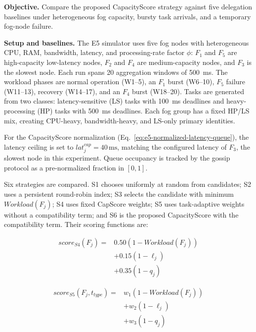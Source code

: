 \documentclass[conference]{IEEEtran}
\begin{document}
    \textbf{Objective.} Compare the proposed CapacityScore strategy against five delegation baselines under heterogeneous fog capacity, bursty task arrivals, and a temporary fog-node failure.

    \textbf{Setup and baselines.} The E5 simulator uses five fog nodes with heterogeneous CPU, RAM, bandwidth, latency, and processing-rate factor $\phi$: $F_1$ and $F_5$ are high-capacity low-latency nodes, $F_2$ and $F_4$ are medium-capacity nodes, and $F_3$ is the slowest node. Each run spans 20 aggregation windows of 500~ms. The workload phases are normal operation (W1--5), an $F_1$ burst (W6--10), $F_5$ failure (W11--13), recovery (W14--17), and an $F_4$ burst (W18--20). Tasks are generated from two classes: latency-sensitive (LS) tasks with 100~ms deadlines and heavy-processing (HP) tasks with 500~ms deadlines. Each fog group has a fixed HP/LS mix, creating CPU-heavy, bandwidth-heavy, and LS-only primary identities.

    For the CapacityScore normalization (Eq.~\eqref{eq:e5-normalized-latency-queue}), the latency ceiling is set to $lat_j^{cap} = 40\,\text{ms}$, matching the configured latency of $F_3$, the slowest node in this experiment. Queue occupancy is tracked by the gossip protocol as a pre-normalized fraction in $[0,1]$.

    Six strategies are compared. S1 chooses uniformly at random from candidates; S2 uses a persistent round-robin index; S3 selects the candidate with minimum $Workload(F_j)$; S4 uses fixed CapScore weights; S5 uses task-adaptive weights without a compatibility term; and S6 is the proposed CapacityScore with the compatibility term. Their scoring functions are:

    \begin{equation}
    \begin{aligned}
    score_{S4}(F_j) ={}& 0.50(1-Workload(F_j)) \\
    &+ 0.15(1-\ell_j) \\
    &+ 0.35(1-q_j)
    \end{aligned}
    \label{eq:s4-score}
    \end{equation}

    \begin{equation}
    \begin{aligned}
    score_{S5}(F_j,t_{type}) ={}& w_1(1-Workload(F_j)) \\
    &+ w_2(1-\ell_j) \\
    &+ w_3(1-q_j)
    \end{aligned}
    \label{eq:s5-score}
    \end{equation}
\end{document}
